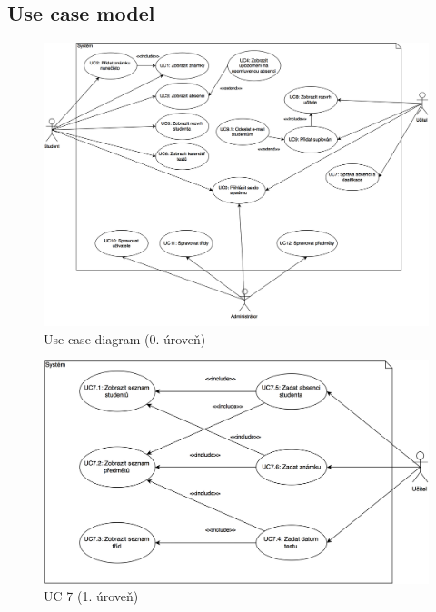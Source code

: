 \documentclass[a4paper,10pt,titlepage]{article}
\begin{document}
	\subsection{Use case model}
		\begin{figure}[h!]
			\centering
					\includegraphics[width=\textwidth]{vis_use_case_diagram}
			\caption{Use case diagram (0. úroveň)}
		\end{figure}
		\begin{figure}[h!]
			\centering
					\includegraphics[width=\textwidth]{vis_use_case_diagram_7}
			\caption{UC 7 (1. úroveň)}
		\end{figure}
\end{document}
